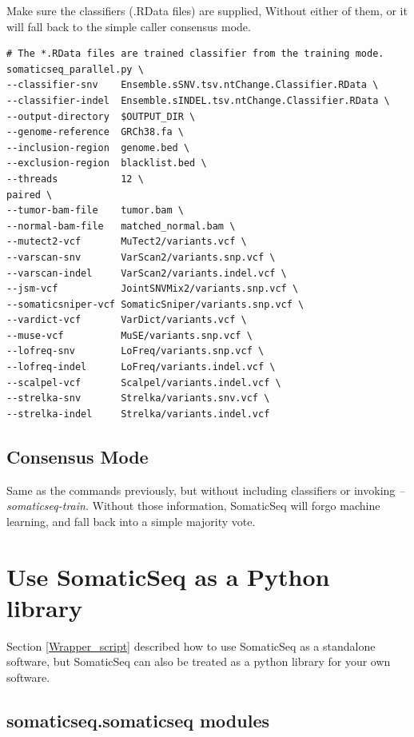 \documentclass[10pt,letterpaper]{article}
\begin{document}
\begin{sloppypar}
Make sure the classifiers (.RData files) are supplied, Without either of them, or it will fall back to the simple caller consensus mode.


\begin{lstlisting}
# The *.RData files are trained classifier from the training mode.
somaticseq_parallel.py \
--classifier-snv    Ensemble.sSNV.tsv.ntChange.Classifier.RData \
--classifier-indel  Ensemble.sINDEL.tsv.ntChange.Classifier.RData \
--output-directory  $OUTPUT_DIR \
--genome-reference  GRCh38.fa \
--inclusion-region  genome.bed \
--exclusion-region  blacklist.bed \
--threads           12 \
paired \
--tumor-bam-file    tumor.bam \
--normal-bam-file   matched_normal.bam \
--mutect2-vcf       MuTect2/variants.vcf \
--varscan-snv       VarScan2/variants.snp.vcf \
--varscan-indel     VarScan2/variants.indel.vcf \
--jsm-vcf           JointSNVMix2/variants.snp.vcf \
--somaticsniper-vcf SomaticSniper/variants.snp.vcf \
--vardict-vcf       VarDict/variants.vcf \
--muse-vcf          MuSE/variants.snp.vcf \
--lofreq-snv        LoFreq/variants.snp.vcf \
--lofreq-indel      LoFreq/variants.indel.vcf \
--scalpel-vcf       Scalpel/variants.indel.vcf \
--strelka-snv       Strelka/variants.snv.vcf \
--strelka-indel     Strelka/variants.indel.vcf
\end{lstlisting}



\subsection{Consensus Mode} \label{somaticseq_default_mode}

Same as the commands previously, but without including classifiers or invoking \textit{--somaticseq-train}. Without those information, SomaticSeq will forgo machine learning, and fall back into a simple majority vote.




\section{Use SomaticSeq as a Python library} \label{somaticseq_package}


Section \ref{Wrapper_script} described how to use SomaticSeq as a standalone software, but SomaticSeq can also be treated as a python library for your own software. 


\subsection{somaticseq.somaticseq modules} \label{module:somaticseq}


\end{sloppypar}
\end{document}
